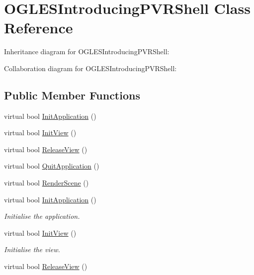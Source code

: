 \hypertarget{class_o_g_l_e_s_introducing_p_v_r_shell}{\section{O\+G\+L\+E\+S\+Introducing\+P\+V\+R\+Shell Class Reference}
\label{class_o_g_l_e_s_introducing_p_v_r_shell}
}


Inheritance diagram for O\+G\+L\+E\+S\+Introducing\+P\+V\+R\+Shell\+:


Collaboration diagram for O\+G\+L\+E\+S\+Introducing\+P\+V\+R\+Shell\+:
\subsection*{Public Member Functions}
\begin{DoxyCompactItemize}
\item 
virtual bool \hyperlink{class_o_g_l_e_s_introducing_p_v_r_shell_aa96d31ec885e876d331a7d49f8b9861f}{Init\+Application} ()
\item 
virtual bool \hyperlink{class_o_g_l_e_s_introducing_p_v_r_shell_a2ad2a32cce89fe06f2b74048080bea83}{Init\+View} ()
\item 
virtual bool \hyperlink{class_o_g_l_e_s_introducing_p_v_r_shell_ad1203f1fea73802d8a0d7c5a00c3d572}{Release\+View} ()
\item 
virtual bool \hyperlink{class_o_g_l_e_s_introducing_p_v_r_shell_a885652badd9db2ee9795a3e472999fb9}{Quit\+Application} ()
\item 
virtual bool \hyperlink{class_o_g_l_e_s_introducing_p_v_r_shell_a2ea1184259b9c8b850a15b4559d520e1}{Render\+Scene} ()
\item 
virtual bool \hyperlink{class_o_g_l_e_s_introducing_p_v_r_shell_a00b83622340cc85888ecf79413d7d520}{Init\+Application} ()
\begin{DoxyCompactList}\small\item\em Initialise the application. \end{DoxyCompactList}\item 
virtual bool \hyperlink{class_o_g_l_e_s_introducing_p_v_r_shell_a994b9fe6a911585ca74d5dd3d1619113}{Init\+View} ()
\begin{DoxyCompactList}\small\item\em Initialise the view. \end{DoxyCompactList}\item 
virtual bool \hyperlink{class_o_g_l_e_s_introducing_p_v_r_shell_a2aeacee02984ca5237f2fc6ae138078a}{Release\+View} ()

\end{DoxyCompactItemize}
